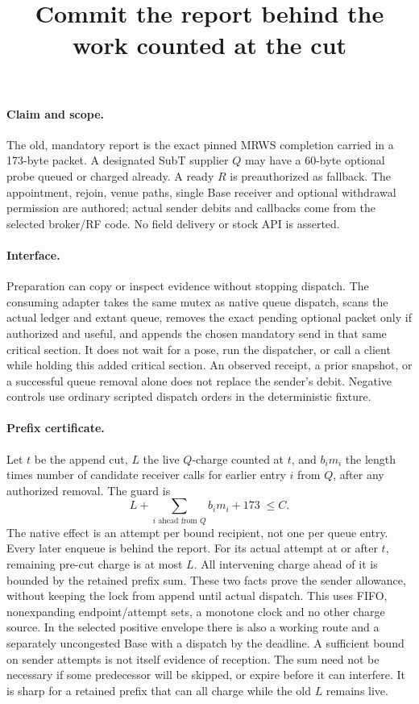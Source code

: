 \documentclass[11pt]{article}
\title{Commit the report behind the work counted at the cut}
\author{}
\date{}
\begin{document}
\maketitle

\paragraph{Claim and scope.}
The old, mandatory report is the exact pinned MRWS completion carried in a
173-byte packet. A designated SubT supplier \(Q\) may have a 60-byte optional
probe queued or charged already. A ready \(R\) is preauthorized as fallback.
The appointment, rejoin, venue paths, single Base receiver and optional
withdrawal permission are authored; actual sender debits and callbacks come
from the selected broker/RF code. No field delivery or stock API is asserted.

\paragraph{Interface.}
Preparation can copy or inspect evidence without stopping dispatch.
The consuming adapter takes the same mutex as native queue dispatch, scans
the actual ledger and extant queue, removes the exact pending optional
packet only if authorized and useful, and appends the chosen mandatory
send in that same critical section. It does not wait for a pose, run the
dispatcher, or call a client while holding this added critical section.
An observed receipt, a prior snapshot, or a successful queue removal
alone does not replace the sender's debit. Negative controls use ordinary
scripted dispatch orders in the deterministic fixture.

\paragraph{Prefix certificate.}
Let \(t\) be the append cut, \(L\) the live \(Q\)-charge counted at \(t\),
and \(b_i m_i\) the length times number of candidate receiver calls for
earlier entry \(i\) from \(Q\), after any authorized removal. The guard is
\[
  L+\sum_{i\text{ ahead from }Q} b_i m_i + 173 \;\le C .
\]
The native effect is an attempt per bound recipient, not one per queue entry.
Every later enqueue is behind the report. For its actual attempt at or after
\(t\), remaining pre-cut charge is at most \(L\). All intervening charge ahead
of it is bounded by the retained prefix sum. These two facts prove the
sender allowance, without keeping the lock from append until actual dispatch.
This uses FIFO, nonexpanding endpoint/attempt sets, a monotone clock and no
other charge source. In the selected positive envelope there is also a working
route and a separately uncongested Base with a dispatch by the deadline.
A sufficient bound on sender attempts is not itself evidence of reception.
The sum need not be necessary if some predecessor will be skipped, or expire
before it can interfere. It is sharp for a retained prefix that can all
charge while the old \(L\) remains live.
\end{document}
